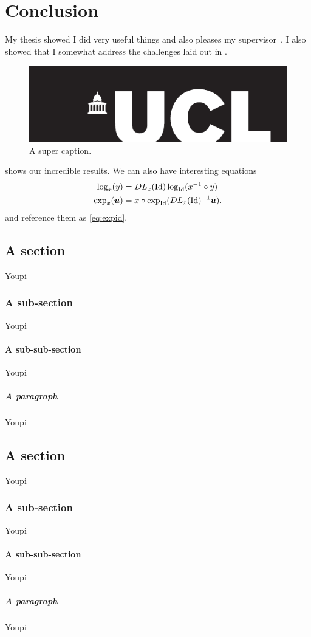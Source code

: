 \chapter{Conclusion}
\label{chap:conclusion}
\minitoc


My thesis showed I did very useful things and also pleases my supervisor~\cite{Ourselin:MICCAI:00}. I also showed that I somewhat address the challenges laid out in .

\begin{figure}[htb!]
\centering
\includegraphics[width=0.60\linewidth]{figs/University_College_London_logo}
\caption{A super caption.\label{fig:logo}}
\end{figure}

 shows our incredible results. We can also have interesting equations
\begin{align}
\log_x(y) &= DL_x(\operatorname{Id}) \log_{\operatorname{Id}}(x^{-1} \circ y) \label{eq:logid}\\
\exp_{x}(\boldsymbol{u}) &= x \circ \exp_{\operatorname{Id}}( DL_x(\operatorname{Id})^{-1} \boldsymbol{u} ).
\label{eq:expid}
\end{align}
and reference them as \eqref{eq:expid}.

\section{A section}
%
Youpi

\subsection{A sub-section}
%
Youpi

\subsubsection{A sub-sub-section}
%
Youpi

\paragraph{A paragraph}
%
Youpi

\section{A section}
%
Youpi

\subsection{A sub-section}
%
Youpi

\subsubsection{A sub-sub-section}
%
Youpi

\paragraph{A paragraph}
%
Youpi